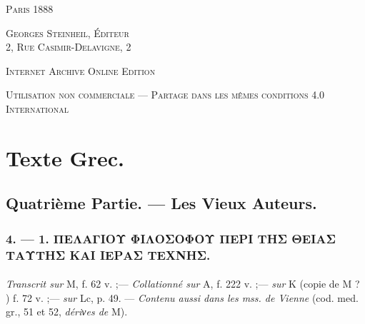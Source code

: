 \documentclass[a4paper, 11pt, oneside, polutonikogreek, french]{article}
\begin{document}
\begin{titlepage}
        \vspace*{\fill}

	\vspace{1\baselineskip}

	{\small\scshape Paris 1888}
	
	{\small\scshape{Georges Steinheil, Éditeur \\2, Rue Casimir-Delavigne, 2}}
	
	\vspace{0.5\baselineskip} %

    \scshape Internet Archive Online Edition  %
	
	{\scshape\small Utilisation non commerciale --- Partage dans les mêmes conditions 4.0 International} %
\end{titlepage}
\setlength{\parskip}{1mm plus1mm minus1mm}
\clearpage
\tableofcontents
\clearpage
\section{Texte Grec.}
\subsection{Quatrième Partie. --- Les Vieux Auteurs.}
\subsubsection{4. --- 1. ΠΕΛΑΓΙΟΥ ΦΙΛΟΣΟΦΟΥ ΠΕΡΙ ΤΗΣ ΘΕΙΑΣ ΤΑΥΤΗΣ ΚΑΙ ΙΕΡΑΣ ΤΕΧΝΗΣ.}
\paragraph{}
\emph{Transcrit sur} M, f. 62 v. ;--- \emph{Collationné sur} A, f. 222 v. ;--- \emph{sur} K (copie de M ? ) f. 72 v. ;--- \emph{sur} Lc, p. 49. --- \emph{Contenu aussi dans les mss. de Vienne} (cod. med. gr., 51 et 52, \emph{dériνes de} M).

\bigskip
\end{document}
